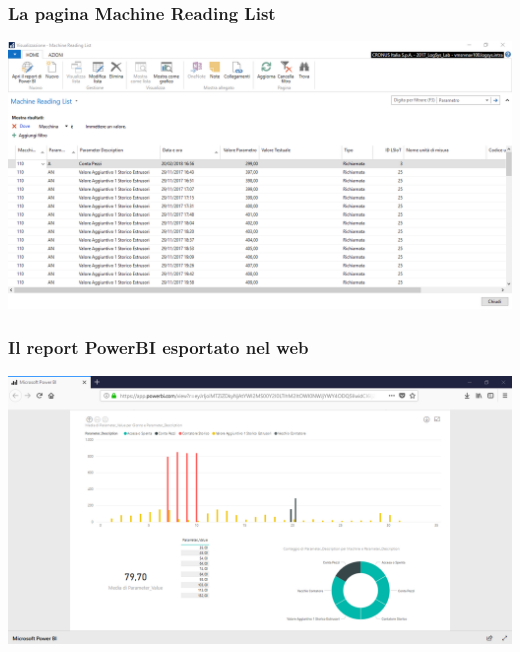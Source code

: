 \documentclass{beamer}
\begin{document}
\begin{frame}
\frametitle{La pagina Machine Reading List}
\includegraphics[width=1\textwidth]{images/MachineReadingList.png}
\end{frame}


\begin{frame}
\frametitle{Il report PowerBI esportato nel web}
\includegraphics[width=1\textwidth]{images/ReportWEB.png}
\end{frame}



\end{document}

